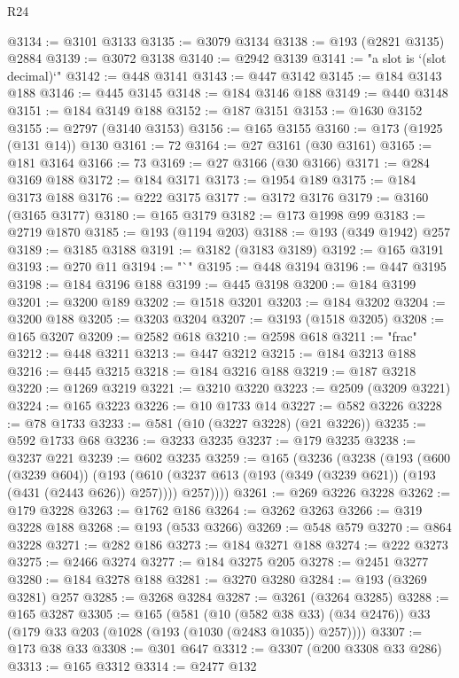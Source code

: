 \begin{lexlean}{R24}
\begin{coremodule}
@3134 := @3101 @3133
@3135 := @3079 @3134
@3138 := @193 (@2821 @3135) @2884
@3139 := @3072 @3138
@3140 := @2942 @3139
@3141 := "a slot is `(slot decimal)`"
@3142 := @448 @3141
@3143 := @447 @3142
@3145 := @184 @3143 @188
@3146 := @445 @3145
@3148 := @184 @3146 @188
@3149 := @440 @3148
@3151 := @184 @3149 @188
@3152 := @187 @3151
@3153 := @1630 @3152
@3155 := @2797 (@3140 @3153)
@3156 := @165 @3155
@3160 := @173 (@1925 (@131 @14)) @130
@3161 := 72
@3164 := @27 @3161 (@30 @3161)
@3165 := @181 @3164
@3166 := 73
@3169 := @27 @3166 (@30 @3166)
@3171 := @284 @3169 @188
@3172 := @184 @3171
@3173 := @1954 @189
@3175 := @184 @3173 @188
@3176 := @222 @3175
@3177 := @3172 @3176
@3179 := @3160 (@3165 @3177)
@3180 := @165 @3179
@3182 := @173 @1998 @99
@3183 := @2719 @1870
@3185 := @193 (@1194 @203)
@3188 := @193 (@349 @1942) @257
@3189 := @3185 @3188
@3191 := @3182 (@3183 @3189)
@3192 := @165 @3191
@3193 := @270 @11
@3194 := "`"
@3195 := @448 @3194
@3196 := @447 @3195
@3198 := @184 @3196 @188
@3199 := @445 @3198
@3200 := @184 @3199
@3201 := @3200 @189
@3202 := @1518 @3201
@3203 := @184 @3202
@3204 := @3200 @188
@3205 := @3203 @3204
@3207 := @3193 (@1518 @3205)
@3208 := @165 @3207
@3209 := @2582 @618
@3210 := @2598 @618
@3211 := "frac"
@3212 := @448 @3211
@3213 := @447 @3212
@3215 := @184 @3213 @188
@3216 := @445 @3215
@3218 := @184 @3216 @188
@3219 := @187 @3218
@3220 := @1269 @3219
@3221 := @3210 @3220
@3223 := @2509 (@3209 @3221)
@3224 := @165 @3223
@3226 := @10 @1733 @14
@3227 := @582 @3226
@3228 := @78 @1733
@3233 := @581 (@10 (@3227 @3228) (@21 @3226))
@3235 := @592 @1733 @68
@3236 := @3233 @3235
@3237 := @179 @3235
@3238 := @3237 @221
@3239 := @602 @3235
@3259 := @165
    (@3236
      (@3238
        (@193
          (@600 (@3239 @604))
          (@193
            (@610 (@3237 @613 (@193 (@349 (@3239 @621)) (@193 (@431 (@2443 @626)) @257))))
            @257))))
@3261 := @269 @3226 @3228
@3262 := @179 @3228
@3263 := @1762 @186
@3264 := @3262 @3263
@3266 := @319 @3228 @188
@3268 := @193 (@533 @3266)
@3269 := @548 @579
@3270 := @864 @3228
@3271 := @282 @186
@3273 := @184 @3271 @188
@3274 := @222 @3273
@3275 := @2466 @3274
@3277 := @184 @3275 @205
@3278 := @2451 @3277
@3280 := @184 @3278 @188
@3281 := @3270 @3280
@3284 := @193 (@3269 @3281) @257
@3285 := @3268 @3284
@3287 := @3261 (@3264 @3285)
@3288 := @165 @3287
@3305 := @165
    (@581
      (@10 (@582 @38 @33) (@34 @2476))
      @33
      (@179 @33 @203 (@1028 (@193 (@1030 (@2483 @1035)) @257))))
@3307 := @173 @38 @33
@3308 := @301 @647
@3312 := @3307 (@200 @3308 @33 @286)
@3313 := @165 @3312
@3314 := @2477 @132

\end{coremodule}
\end{lexlean}
